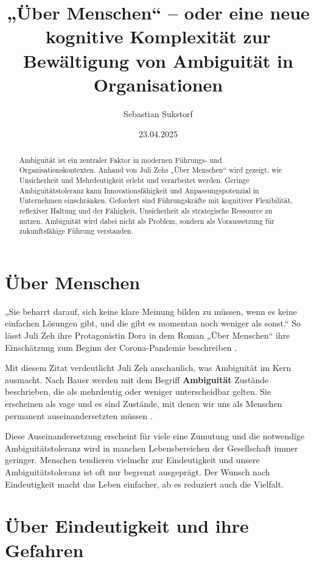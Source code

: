 \documentclass[
  ngerman,
  letterpaper,
  DIV=11]{scrartcl}
\title{„Über Menschen`` -- oder eine neue kognitive Komplexität zur
Bewältigung von Ambiguität in Organisationen}
\author{Sebastian Sukstorf}
\date{23.04.2025}
\renewcommand*\contentsname{Inhaltsverzeichnis}
\newcommand\contentsname{Inhaltsverzeichnis}
\begin{document}
\maketitle
\begin{abstract}
Ambiguität ist ein zentraler Faktor in modernen Führungs- und
Organisationskontexten. Anhand von Juli Zehs „Über Menschen`` wird
gezeigt, wie Unsicherheit und Mehrdeutigkeit erlebt und verarbeitet
werden. Geringe Ambiguitätstoleranz kann Innovationsfähigkeit und
Anpassungspotenzial in Unternehmen einschränken. Gefordert sind
Führungskräfte mit kognitiver Flexibilität, reflexiver Haltung und der
Fähigkeit, Unsicherheit als strategische Ressource zu nutzen. Ambiguität
wird dabei nicht als Problem, sondern als Voraussetzung für
zukunftsfähige Führung verstanden.
\end{abstract}

\renewcommand*\contentsname{Inhaltsverzeichnis}
{
\hypersetup{linkcolor=}
\setcounter{tocdepth}{3}
\tableofcontents
}

\section{Über Menschen}\label{uxfcber-menschen}

„Sie beharrt darauf, sich keine klare Meinung bilden zu müssen, wenn es
keine einfachen Lösungen gibt, und die gibt es momentan noch weniger als
sonst.`` So lässt Juli Zeh ihre Protagonistin Dora in dem Roman „Über
Menschen`` ihre Einschätzung zum Beginn der Corona-Pandemie beschreiben
\autocite[28.]{zeh2022}.

Mit diesem Zitat verdeutlicht Juli Zeh anschaulich, was Ambiguität im
Kern ausmacht. Nach Bauer werden mit dem Begriff \textbf{Ambiguität}
Zustände beschrieben, die als mehrdeutig oder weniger unterscheidbar
gelten. Sie erscheinen als vage und es sind Zustände, mit denen wir uns
als Menschen permanent auseinandersetzten müssen
\autocite[13]{bauer2018}.

Diese Auseinandersetzung erscheint für viele eine Zumutung und die
notwendige Ambiguitätstoleranz wird in manchen Lebensbereichen der
Gesellschaft immer geringer. Menschen tendieren vielmehr zur
Eindeutigkeit und unsere Ambiguitätstoleranz ist oft nur begrenzt
ausgeprägt. Der Wunsch nach Eindeutigkeit macht das Leben einfacher, ab
es reduziert auch die Vielfalt.

\section{Über Eindeutigkeit und ihre
Gefahren}\label{uxfcber-eindeutigkeit-und-ihre-gefahren}
\end{document}

